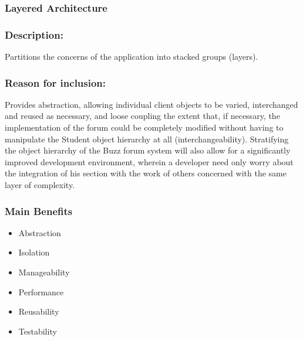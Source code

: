 				\subsubsection{Layered Architecture}
				\subsubsection*{Description:}
				Partitions the concerns of the application into stacked groups (layers).
						
				\subsubsection*{Reason for inclusion:}
					Provides abstraction, allowing individual client objects to be varied, interchanged and reused as necessary, and loose coupling the extent that, if necessary, the implementation of the forum could be completely modified without having to manipulate the Student object hierarchy at all (interchangeability). 
					Stratifying the object hierarchy of the Buzz forum system will also allow for a significantly improved development environment, wherein a developer need only worry about the integration of his section with the work of others concerned with the same layer of complexity. 
					
					
					\subsubsection*{Main Benefits}
					\begin{itemize}
						\item Abstraction
						\item Isolation
						\item Manageability
						\item Performance
						\item Reusability
						\item Testability
					\end{itemize}
	